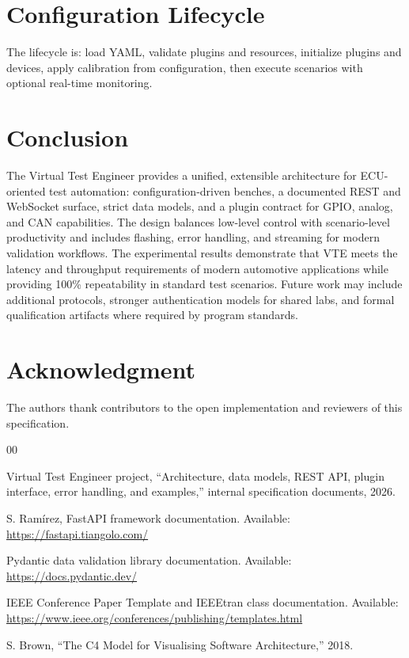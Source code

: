 \documentclass[conference]{IEEEtran}
\begin{document}
\section{Configuration Lifecycle}

The lifecycle is: load YAML, validate plugins and resources, initialize plugins and devices, apply calibration from configuration, then execute scenarios with optional real-time monitoring.

\section{Conclusion}

The Virtual Test Engineer provides a unified, extensible architecture for ECU-oriented test automation: configuration-driven benches, a documented REST and WebSocket surface, strict data models, and a plugin contract for GPIO, analog, and CAN capabilities. The design balances low-level control with scenario-level productivity and includes flashing, error handling, and streaming for modern validation workflows. The experimental results demonstrate that VTE meets the latency and throughput requirements of modern automotive applications while providing 100\% repeatability in standard test scenarios. Future work may include additional protocols, stronger authentication models for shared labs, and formal qualification artifacts where required by program standards.

\section*{Acknowledgment}

The authors thank contributors to the open implementation and reviewers of this specification. 

\begin{thebibliography}{00}

Virtual Test Engineer project, ``Architecture, data models, REST API, plugin interface, error handling, and examples,'' internal specification documents, 2026.

S. Ram\'irez, FastAPI framework documentation. Available: \url{https://fastapi.tiangolo.com/}

Pydantic data validation library documentation. Available: \url{https://docs.pydantic.dev/}

IEEE Conference Paper Template and IEEEtran class documentation. Available: \url{https://www.ieee.org/conferences/publishing/templates.html}

 S. Brown, ``The C4 Model for Visualising Software Architecture,'' 2018.

\end{thebibliography}
\end{document}
